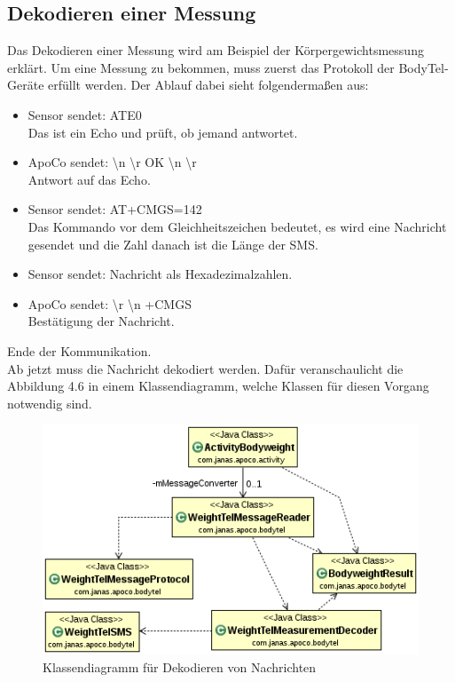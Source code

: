 \subsection{Dekodieren einer Messung}

Das Dekodieren einer Messung wird am Beispiel der K\"orpergewichtsmessung erkl\"art.
Um eine Messung zu bekommen, muss zuerst das Protokoll der BodyTel-Ger\"ate erf\"ullt werden.
Der Ablauf dabei sieht folgenderma\ss{}en aus:
\begin{itemize}
 \item Sensor sendet: ATE0\\
 Das ist ein Echo und pr\"uft, ob jemand antwortet.
 \item ApoCo sendet: \textbackslash n \textbackslash r OK \textbackslash n \textbackslash r\\
 Antwort auf das Echo.
 \item Sensor sendet: AT+CMGS=142\\
 Das Kommando vor dem Gleichheitszeichen bedeutet, es wird eine Nachricht gesendet 
 und die Zahl danach ist die L\"ange der SMS.
 \item Sensor sendet: Nachricht als Hexadezimalzahlen.
 \item ApoCo sendet: \textbackslash r \textbackslash n +CMGS\\
 Best\"atigung der Nachricht.
\end{itemize}
Ende der Kommunikation.\\

Ab jetzt muss die Nachricht dekodiert werden. 
Daf\"ur veranschaulicht die Abbildung 4.6 in einem Klassendiagramm, welche Klassen f\"ur diesen Vorgang notwendig sind.

\begin{figure}[h]
  \centering
  \includegraphics[scale=0.78]{diagramme/kapitel4/uml/weighttel_messagedecode.png}
  \caption{Klassendiagramm f\"ur Dekodieren von Nachrichten}
  
\end{figure}

